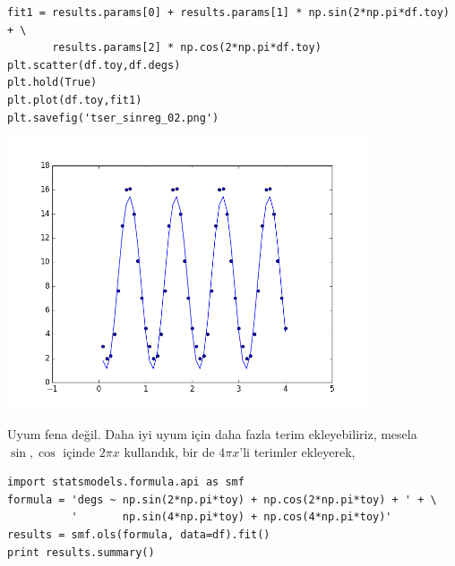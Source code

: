 \documentclass[12pt,fleqn]{article}\usepackage{../../common}
\begin{document}
\begin{verbatim}
fit1 = results.params[0] + results.params[1] * np.sin(2*np.pi*df.toy) + \
       results.params[2] * np.cos(2*np.pi*df.toy)
plt.scatter(df.toy,df.degs)
plt.hold(True)
plt.plot(df.toy,fit1)
plt.savefig('tser_sinreg_02.png')
\end{verbatim}

\includegraphics[height=8cm]{tser_sinreg_02.png}

Uyum fena değil. Daha iyi uyum için daha fazla terim ekleyebiliriz, mesela 
$\sin,\cos$ içinde $2 \pi x$ kullandık, bir de $4 \pi x$'li terimler ekleyerek,

\begin{verbatim}
import statsmodels.formula.api as smf
formula = 'degs ~ np.sin(2*np.pi*toy) + np.cos(2*np.pi*toy) + ' + \
          '       np.sin(4*np.pi*toy) + np.cos(4*np.pi*toy)'
results = smf.ols(formula, data=df).fit()
print results.summary()
\end{verbatim}
\end{document}
